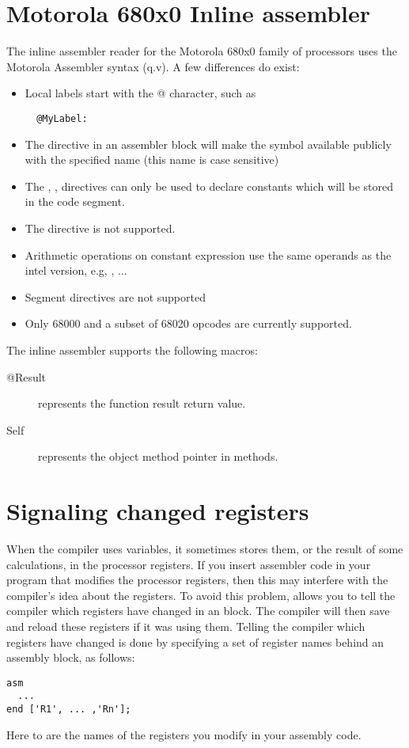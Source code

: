 \section{Motorola 680x0 Inline assembler}

The inline assembler reader for the Motorola 680x0 family of processors
uses the Motorola Assembler syntax (q.v). A few differences do exist:

\begin{itemize}
\item Local labels start with the @ character, such as
\begin{verbatim}
  @MyLabel:
\end{verbatim}
\item The  directive in an assembler block will
make the symbol available publicly with the specified name
(this name is case sensitive)
\item The , ,  directives can only
be used to declare constants which will be stored in the
code segment.
\item The  directive is not supported.
\item Arithmetic operations on constant expression use the same
operands as the intel version, e.g,  ,  ...
\item Segment directives are not supported
\item Only 68000 and a subset of 68020 opcodes are currently supported.
\end{itemize}

The inline assembler supports the following macros:
\begin{description}
\item [@Result] represents the function result return value.
\item [Self] represents the object method pointer in methods.
\end{description}



\section{Signaling changed registers}
\label{se:RegChanges}
When the compiler uses variables, it sometimes stores them, or the result of
some calculations, in the processor registers. If you insert assembler code
in your program that modifies the processor registers, then this may
interfere with the compiler's idea about the registers. To avoid this
problem, \fpc allows you to tell the compiler which registers have changed
in an  block.
The compiler will then save and reload these registers if it was using them. 
Telling the compiler which registers have changed is done by specifying a 
set of register names
behind an assembly block, as follows:
\begin{verbatim}
asm
  ...
end ['R1', ... ,'Rn'];
\end{verbatim}
Here  to  are the names of the registers you
modify in your assembly code.

